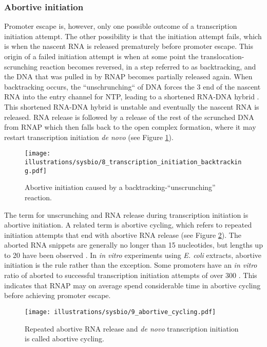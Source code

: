 \subsubsection{Abortive initiation}
Promoter escape is, however, only one possible outcome of a transcription
initiation attempt. The other possibility is that the initiation attempt fails,
which is when the nascent RNA is released prematurely before promoter escape.
This origin of a failed initiation attempt is when at some point the
translocation-scrunching reaction becomes reversed, in a step referred to as
backtracking, and the DNA that was pulled in by RNAP becomes partially released
again. When backtracking occurs, the ``unschrunching`` of DNA forces the 3\ppp
end of the nascent RNA into the entry channel for NTP, leading to a shortened
RNA-DNA hybrid \cite{hsu_initial_2006}. This shortened RNA-DNA hybrid is
unstable and eventually the nascent RNA is released. RNA release is followed by
a release of the rest of the scrunched DNA from RNAP which then falls back to
the open complex formation, where it may restart transcription initiation
\textit{de novo} \cite{lilian_m_promoter_2002} (see Figure
\ref{fig:abortive_backtrack}).

\begin{figure}[htb]
	\begin{center}
		\texttt{[image: illustrations/sysbio/8\_transcription\_initiation\_backtracking.pdf]}
	\end{center}
	\caption{Abortive initiation caused by a backtracking-``unscrunching''
	reaction.}
	\label{fig:abortive_backtrack}
\end{figure}

The term for unscrunching and RNA release during transcription initiation is
abortive initiation. A related term is abortive cycling, which refers to
repeated initiation attempts that end with abortive RNA release (see Figure
\ref{fig:abortive_cycling}). The aborted RNA snippets are generally no longer
than 15 nucleotides, but lengths up to 20 have been observed
\cite{chander_alternate_2007}. In \textit{in vitro} experiments using
\textit{E. coli} extracts, abortive initiation is the rule rather than the
exception. Some promoters have an \textit{in vitro} ratio of aborted to
successful transcription initiation attempts of over 300
\cite{hsu_initial_2006}. This indicates that RNAP may on average spend
considerable time in abortive cycling before achieving promoter escape.

\begin{figure}[htb]
	\begin{center}
		\texttt{[image: illustrations/sysbio/9\_abortive\_cycling.pdf]}
	\end{center}
	\caption{Repeated abortive RNA release and \textit{de novo} transcription
	initiation is called abortive cycling.}
	\label{fig:abortive_cycling}
\end{figure}

